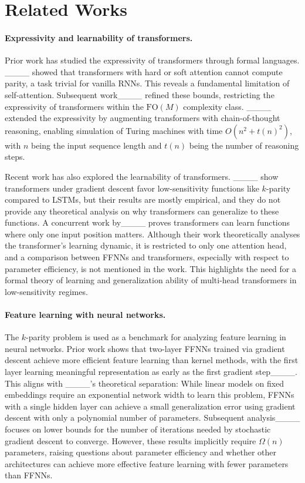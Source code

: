 \section{Related Works}
\paragraph{Expressivity and learnability of transformers.}
Prior work has studied the expressivity of transformers through formal languages. ____ showed that transformers with hard or soft attention cannot compute parity, a task trivial for vanilla RNNs. This reveals a fundamental limitation of self-attention. Subsequent work____ refined these bounds, restricting the expressivity of transformers within the $\text{FO}(M)$ complexity class. ____ extended the expressivity by augmenting transformers with chain-of-thought reasoning, enabling simulation of Turing machines with time $O(n^2 + t(n)^2)$, with $n$ being the input sequence length and $t(n)$ being the number of reasoning steps.

Recent work has also explored the learnability of transformers. 
____ show transformers under gradient descent favor low-sensitivity functions like $k$-parity compared to LSTMs, but their results are mostly empirical, and they do not provide any theoretical analysis on why transformers can generalize to these functions. A concurrent work by____ proves transformers can learn functions where only one input position matters. Although their work theoretically analyses the transformer's learning dynamic, it is restricted to only one attention head, and a comparison between FFNNs and transformers, especially with respect to parameter efficiency, is not mentioned in the work. This highlights the need for a formal theory of learning and generalization ability of multi-head transformers in low-sensitivity regimes.

\paragraph{Feature learning with neural networks.}
The $k$-parity problem is used as a benchmark for analyzing feature learning in neural networks. Prior work shows that two-layer FFNNs trained via gradient descent achieve more efficient feature learning than kernel methods, with the first layer learning meaningful representation as early as the first gradient step____. This aligns with ____'s theoretical separation: While linear models on fixed embeddings require an exponential network width to learn this problem, FFNNs with a single hidden layer can achieve a small generalization error using gradient descent with only a polynomial number of parameters. Subsequent analysis____ focuses on lower bounds for the number of iterations needed by stochastic gradient descent to converge.
%
However, these results implicitly require $\Omega(n)$ parameters, raising questions about parameter efficiency and whether other architectures can achieve more effective feature learning with fewer parameters than FFNNs.
